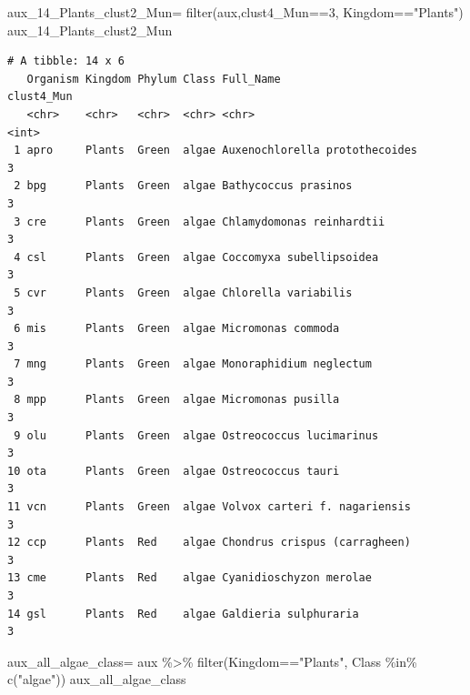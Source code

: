 \documentclass[
  letterpaper,
  DIV=11,
  numbers=noendperiod]{scrreprt}
\newenvironment{Shaded}{}{}
\newcommand{\DecValTok}[1]{\textcolor[rgb]{0.82,0.60,0.40}{#1}}
\newcommand{\FunctionTok}[1]{\textcolor[rgb]{0.38,0.69,0.94}{#1}}
\newcommand{\NormalTok}[1]{\textcolor[rgb]{0.67,0.70,0.75}{#1}}
\newcommand{\OtherTok}[1]{\textcolor[rgb]{0.15,0.68,0.38}{#1}}
\newcommand{\SpecialCharTok}[1]{\textcolor[rgb]{0.34,0.71,0.76}{#1}}
\newcommand{\StringTok}[1]{\textcolor[rgb]{0.60,0.76,0.47}{#1}}
\begin{document}
\begin{Shaded}
\begin{Highlighting}[]
\NormalTok{aux\_14\_Plants\_clust2\_Mun}\OtherTok{=} \FunctionTok{filter}\NormalTok{(aux,clust4\_Mun}\SpecialCharTok{==}\DecValTok{3}\NormalTok{,}
\NormalTok{                             Kingdom}\SpecialCharTok{==}\StringTok{"Plants"}\NormalTok{)}
\NormalTok{aux\_14\_Plants\_clust2\_Mun}
\end{Highlighting}
\end{Shaded}

\begin{verbatim}
# A tibble: 14 x 6
   Organism Kingdom Phylum Class Full_Name                      clust4_Mun
   <chr>    <chr>   <chr>  <chr> <chr>                               <int>
 1 apro     Plants  Green  algae Auxenochlorella protothecoides          3
 2 bpg      Plants  Green  algae Bathycoccus prasinos                    3
 3 cre      Plants  Green  algae Chlamydomonas reinhardtii               3
 4 csl      Plants  Green  algae Coccomyxa subellipsoidea                3
 5 cvr      Plants  Green  algae Chlorella variabilis                    3
 6 mis      Plants  Green  algae Micromonas commoda                      3
 7 mng      Plants  Green  algae Monoraphidium neglectum                 3
 8 mpp      Plants  Green  algae Micromonas pusilla                      3
 9 olu      Plants  Green  algae Ostreococcus lucimarinus                3
10 ota      Plants  Green  algae Ostreococcus tauri                      3
11 vcn      Plants  Green  algae Volvox carteri f. nagariensis           3
12 ccp      Plants  Red    algae Chondrus crispus (carragheen)           3
13 cme      Plants  Red    algae Cyanidioschyzon merolae                 3
14 gsl      Plants  Red    algae Galdieria sulphuraria                   3
\end{verbatim}

\begin{Shaded}
\begin{Highlighting}[]
\NormalTok{aux\_all\_algae\_class}\OtherTok{=}\NormalTok{ aux }\SpecialCharTok{\%\textgreater{}\%} 
  \FunctionTok{filter}\NormalTok{(Kingdom}\SpecialCharTok{==}\StringTok{"Plants"}\NormalTok{,}
\NormalTok{         Class }\SpecialCharTok{\%in\%} \FunctionTok{c}\NormalTok{(}\StringTok{"algae"}\NormalTok{))}
\NormalTok{aux\_all\_algae\_class}
\end{Highlighting}
\end{Shaded}
\end{document}
